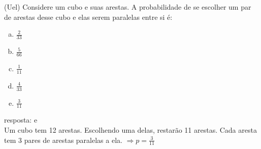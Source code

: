 \begin{ex}
 (Uel) Considere um cubo e suas arestas. A probabilidade de se escolher um par de arestas desse cubo e elas serem paralelas entre si é:
    \begin{enumerate}[(a)]
    \item $\frac{2}{33}$
    \item $\frac{5}{66}$
    \item $\frac{1}{11}$
    \item $\frac{4}{33}$
    \item $\frac{3}{11}$
    \end{enumerate}
      \begin{sol}
       resposta: e \\
       Um cubo tem 12 arestas. Escolhendo uma delas, restarão 11 arestas. Cada aresta tem 3 pares de arestas paralelas a ela. $\Longrightarrow p=\frac{3}{11}$
      \end{sol}
\end{ex}